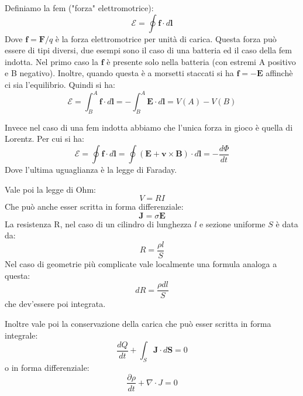\documentclass{article}
\newcommand{\mbf}{\mathbf}
\renewcommand{\div}[1][]{\nabla#1 \cdot}
\numberwithin{equation}{section}
\begin{document}
Definiamo la fem ("forza" elettromotrice):
\begin{equation}
    \mathscr{E} = \oint \mbf f \cdot d \mbf l
\end{equation}
Dove $\mbf f = \mbf F/q$ è la forza elettromotrice per unità di carica. Questa forza può essere di tipi diversi, due esempi sono il caso di una batteria ed il caso della fem indotta. Nel primo caso la $\mbf f$ è presente solo nella batteria (con estremi A positivo e B negativo). Inoltre, quando questa è a morsetti staccati si ha $\mbf f = - \mbf E$ affinchè ci sia l'equilibrio. Quindi si ha:
\begin{equation}
    \mathscr{E} = \int_B^A \mbf f \cdot d \mbf l = - \int_B^A \mbf E \cdot d \mbf l = V(A) - V(B)
\end{equation}

Invece nel caso di una fem indotta abbiamo che l'unica forza in gioco è quella di Lorentz. Per cui si ha:
\begin{equation}
    \mathscr{E} = \oint \mbf f \cdot d \mbf l = \oint (\mbf {E + v \times B}) \cdot d \mbf l  = -\frac{ d\Phi }{ dt } 
\end{equation}
Dove l'ultima uguaglianza è la legge di Faraday.

Vale poi la legge di Ohm:
\begin{equation}
    V=RI
\end{equation}
Che può anche esser scritta in forma differenziale:
\begin{equation}
    \mbf J = \sigma \mbf E
\end{equation}
La resistenza R, nel caso di un cilindro di lunghezza $l$ e sezione uniforme $S$ è data da:
\begin{equation}
    R = \frac{ \rho l  }{ S } 
\end{equation}
Nel caso di geometrie più complicate vale localmente una formula analoga a questa:
\begin{equation}
    dR = \frac{ \rho dl  }{ S } 
\end{equation}
che dev'essere poi integrata.

Inoltre vale poi la conservazione della carica che può esser scritta in forma integrale:
\begin{equation}
    \frac{ dQ }{ dt } + \int_S \mbf J \cdot d \mbf S = 0
\end{equation}
o in forma differenziale:
\begin{equation}
    \frac{ \partial \rho }{ dt } + \div J = 0
\end{equation}
\end{document}
